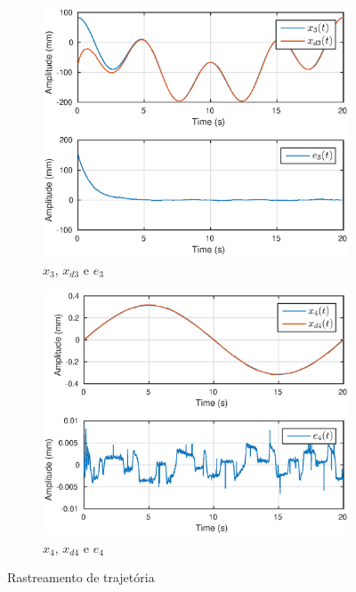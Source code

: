 \begin{figure}[!ht]
\begin{subfigure}{.5\textwidth}
  \includegraphics[width=\linewidth]{./img/trk1/x3.eps}
  \caption{$x_3$, $x_{d3}$ e $e_3$}
  \label{fig:sub1}
\end{subfigure}%
\begin{subfigure}{.5\textwidth}
  \centering
  \includegraphics[width=\linewidth]{./img/trk1/x4.eps}
  \caption{$x_4$, $x_{d4}$ e $e_4$}
  \label{fig:sub2}
\end{subfigure}
\caption{Rastreamento de trajetória}
\label{fig:test}
\end{figure}

